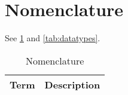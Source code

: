 \documentclass[a4paper, oneside, 11pt, article, english]{memoir}
\begin{document}
\section{Nomenclature}
\label{sec:nomenclature}


See \cref{tab:nomenclature} and \cref{tab:datatypes}.

\begin{table}[htbp]
  \centering
  \caption{Nomenclature}
  \label{tab:nomenclature}
  \begin{tabular}{@{}lp{9cm}@{}}
    \toprule
    Term                & Description                                                                                                                                                                                                                                                                                                                                                     \\
    \midrule

\end{tabular}
\end{table}
\end{document}
